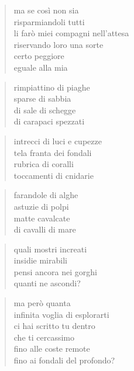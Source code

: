	\begin{verse}
		ma se così non sia\\
		risparmiandoli tutti\\
		li farò miei compagni nell’attesa\\
		riservando loro una sorte\\
		certo peggiore\\
		eguale alla mia
	\end{verse}

\clearpage



	\begin{verse}
		rimpiattino di piaghe\\
		sparse di sabbia\\
		di sale di schegge\\
		di carapaci spezzati
	\end{verse}

	\begin{verse}
		intrecci di luci e cupezze\\
		tela franta dei fondali\\
		rubrica di coralli\\
		toccamenti di cnidarie
	\end{verse}

	\begin{verse}
		farandole di alghe\\
		astuzie di polpi\\
		matte cavalcate\\
		di cavalli di mare
	\end{verse}

	\begin{verse}
		quali mostri increati\\
		insidie mirabili\\
		pensi ancora nei gorghi\\
		quanti ne ascondi?
	\end{verse}

	\begin{verse}
		ma però quanta\\
		infinita voglia di esplorarti\\
		ci hai scritto tu dentro\\
		che ti cercassimo\\
		fino alle coste remote\\
		fino ai fondali del profondo?
	\end{verse}

\clearpage

